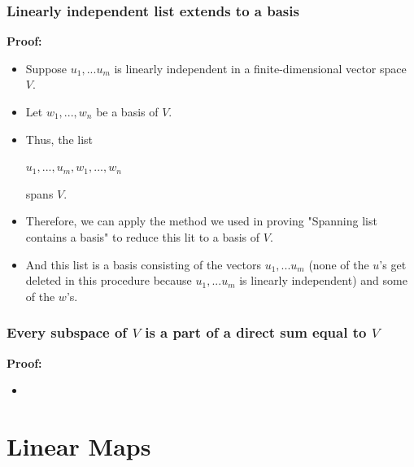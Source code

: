 \documentclass{report}
\begin{document}
\subsection{Linearly independent list extends to a basis}

\textbf{Proof: }
\begin{itemize}
    \item Suppose $u_1,...u_m$ is linearly independent in a finite-dimensional vector space $V$.
    \item Let $w_1,...,w_n$ be a basis of $V$.
    \item Thus, the list\newline
              \centerline{$u_1,...,u_m,w_1,...,w_n$}\newline
          spans $V$.
    \item Therefore, we can apply the method we used in proving "Spanning list contains a basis" to reduce this lit to a basis of $V$.
    \item And this list is a basis consisting of the vectors $u_1,...u_m$ (none of the $u$'s get deleted in this procedure because $u_1,...u_m$ is linearly independent) and some of the $w$'s.
\end{itemize}

\subsection{Every subspace of $V$ is a part of a direct sum equal to $V$}
\textbf{Proof: }\newline
\begin{itemize}
    \item 
\end{itemize}

\chapter{Linear Maps}
\end{document}
